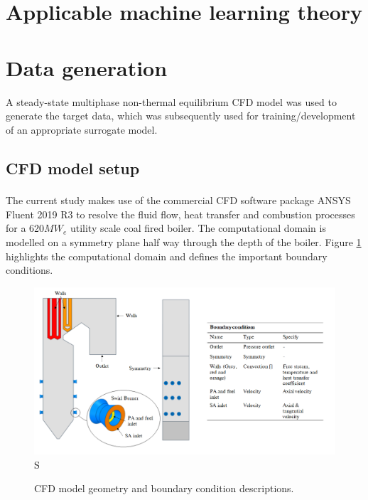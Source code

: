 \documentclass[a4paper,fleqn]{cas-sc}
\begin{document}



\section{Applicable machine learning theory}

\section{Data generation}
A steady-state multiphase non-thermal equilibrium CFD model was used to generate the target data, which was subsequently used for training/development of an appropriate surrogate model.

\subsection{CFD model setup}
The current study makes use of the commercial CFD software package ANSYS\textsuperscript{\textregistered} Fluent 2019 R3 to resolve the fluid flow, heat transfer and combustion processes for a 620$MW_e$ utility scale coal fired boiler. The computational domain is modelled on a symmetry plane half way through the depth of the boiler. Figure \ref{fig_cfd_geom_bc} highlights the computational domain and defines the important boundary conditions.\\ 

\begin{figure}[h!]
	\centering
		\includegraphics[scale=0.5]{CFD_GEOMETRY}S
	  \caption{CFD model geometry and boundary condition descriptions.}\label{fig_cfd_geom_bc}
\end{figure}
\end{document}
